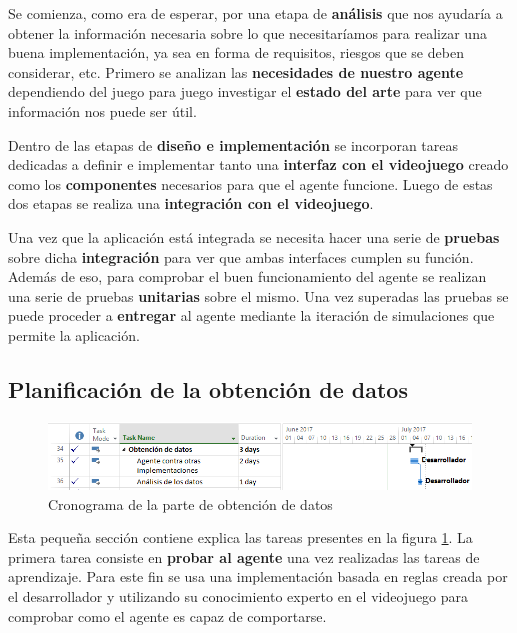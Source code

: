 \bigskip

Se comienza, como era de esperar, por una etapa de \textbf{análisis} que nos ayudaría a obtener la información necesaria sobre lo que necesitaríamos para realizar una buena implementación, ya sea en forma de requisitos, riesgos que se deben considerar, etc. Primero se analizan las \textbf{necesidades de nuestro agente} dependiendo del juego para juego investigar el \textbf{estado del arte} para ver que información nos puede ser útil.

\bigskip

Dentro de las etapas de \textbf{diseño e implementación} se incorporan tareas dedicadas a definir e implementar tanto una \textbf{interfaz con el videojuego} creado como los \textbf{componentes} necesarios para que el agente funcione. Luego de estas dos etapas se realiza una \textbf{integración con el videojuego}.

\bigskip

Una vez que la aplicación está integrada se necesita hacer una serie de \textbf{pruebas} sobre dicha \textbf{integración} para ver que ambas interfaces cumplen su función. Además de eso, para comprobar el buen funcionamiento del agente se realizan una serie de pruebas \textbf{unitarias} sobre el mismo. Una vez superadas las pruebas se puede proceder a \textbf{entregar} al agente mediante la iteración de simulaciones que permite la aplicación.


\subsection{Planificación de la obtención de datos}

\begin{figure}
	\centerline{\includegraphics[width=19cm]{otros/capturasPlanificacion/obtencion_de_datos.PNG}}
	\caption{Cronograma de la parte de obtención de datos}
	\label{plan:datos}
\end{figure}


Esta pequeña sección contiene explica las tareas presentes en la figura \ref{plan:datos}. La primera tarea consiste en \textbf{probar al agente} una vez realizadas las tareas de aprendizaje. Para este fin se usa una implementación basada en reglas creada por el desarrollador y utilizando su conocimiento experto en el videojuego para comprobar como el agente es capaz de comportarse.

